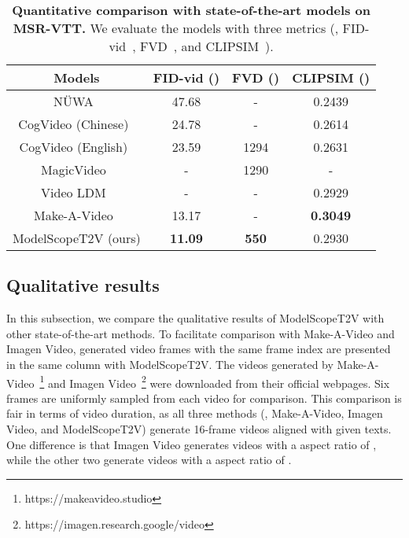 \begin{table}[t]
\centering
\begin{tabular}{c|ccc}
\hline
\textbf{Models}              & FID-vid ()   &  FVD () & CLIPSIM () \\ \hline
N\"UWA~\cite{wu2022nuwa}       & 47.68   & -  & 0.2439        \\
CogVideo (Chinese)~\cite{hong2022cogvideo}   & 24.78 & - & 0.2614      \\
CogVideo (English)~\cite{hong2022cogvideo}   & 23.59  & 1294 & 0.2631  \\
MagicVideo~\cite{zhou2022magicvideo}          & -    & 1290 & -        \\
Video LDM~\cite{blattmann2023align}      & -   &  - & 0.2929 \\ 
Make-A-Video~\cite{singer2022make-a-video}        & 13.17 &  -& \textbf{0.3049}     \\ \hline
ModelScopeT2V (ours) &   \textbf{11.09} & \textbf{550} & 0.2930    \\ \hline
\end{tabular}
\caption{
\textbf{Quantitative comparison with state-of-the-art models on MSR-VTT.} We evaluate the models with three metrics (\ie, FID-vid~\cite{heusel2017gans_nash_equilibrium}, FVD~\cite{unterthiner2018FVD}, and CLIPSIM~\cite{wu2021godiva}).
}
\label{tab:results}
\end{table}


\subsection{Qualitative results} 
In this subsection, we compare the qualitative results of ModelScopeT2V with other state-of-the-art methods. 
To facilitate comparison with Make-A-Video and Imagen Video, generated video frames with the same frame index are presented in the same column with ModelScopeT2V.
The videos generated by Make-A-Video~\cite{singer2022make-a-video}\footnote{https://makeavideo.studio} and Imagen Video~\cite{ho2022imagenvideo}\footnote{https://imagen.research.google/video} were downloaded from their official webpages.
Six frames are uniformly sampled from each video for comparison. 
This comparison is fair in terms of video duration, as all three methods (\ie, Make-A-Video, Imagen Video, and ModelScopeT2V) generate 16-frame videos aligned with given texts.
One difference is that Imagen Video generates videos with a aspect ratio of , while the other two generate videos with a aspect ratio of .



